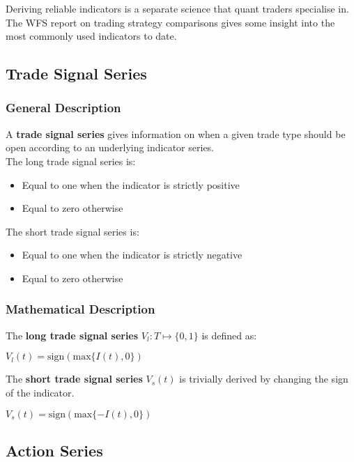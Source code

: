 \documentclass[11pt]{article}
\begin{document}
Deriving reliable indicators is a separate science that quant traders specialise in. The WFS report on trading strategy comparisons gives some insight into the most commonly used indicators to date.

\subsection{Trade Signal Series}

\subsubsection{General Description}

A \textbf{trade signal series} gives information on when a given trade type should be open according to an underlying indicator series.\\

The long trade signal series is:
\begin{itemize}
    \item Equal to one when the indicator is strictly positive
    \item Equal to zero otherwise
\end{itemize}

The short trade signal series is:
\begin{itemize}
    \item Equal to one when the indicator is strictly negative
    \item Equal to zero otherwise
\end{itemize}

\subsubsection{Mathematical Description}

The \textbf{long trade signal series} $V_l:T \mapsto \{ 0,1 \}$ is defined as:
\begin{center}
    $V_l(t) = \text{sign}(\text{max}\{I(t),0 \})$
\end{center}

The \textbf{short trade signal series} $V_s(t)$ is trivially derived by changing the sign of the indicator.
\begin{center}
    $V_s(t) = \text{sign}(\text{max}\{-I(t),0 \})$
\end{center}

\subsection{Action Series}
\end{document}
